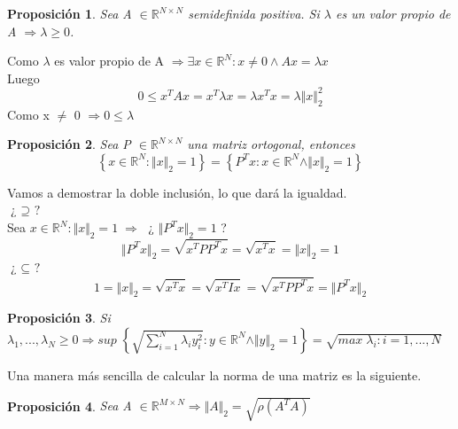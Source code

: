 \documentclass[10pt, a4paper]{article}
\makeatletter
\renewenvironment{proof}[1][\proofname] {\par\pushQED{\qed}\normalfont\topsep6\p@\@plus6\p@\relax\trivlist\item[\hskip\labelsep\itshape\sffamily#1\@addpunct{.}]\ignorespaces}{\popQED\endtrivlist\@endpefalse}
\theoremstyle{theorem-style}
\newtheorem{nprop}{Proposición}[section]
\theoremstyle{definition-style}
\theoremstyle{remark-style}
\theoremstyle{example-style}
\theoremstyle{definition-style}
\theoremstyle{remark-style}
\makeatother
\begin{document}
\begin{nprop}
Sea A $\in \mathbb{R}^{N \times N}$ semidefinida positiva. Si $\lambda$ es un valor propio de A $\Rightarrow \lambda \geq 0$.
\end{nprop}

\begin{proof}
Como $\lambda$ es valor propio de A $\Rightarrow \exists x \in \mathbb{R}^N : x \neq 0 \wedge Ax = \lambda x$\\
Luego\\
\[ 0 \leq x^TAx = x^T \lambda x = \lambda x^Tx = \lambda \Vert x \Vert _2^2 \]
Como x $\neq$ 0 $\Rightarrow 0 \leq \lambda$
\end{proof}

\begin{nprop}
Sea P $\in \mathbb{R}^{N \times N}$ una matriz ortogonal, entonces
\[ \left\lbrace x \in \mathbb{R}^N : \Vert x \Vert _2 = 1 \right\rbrace = \left\lbrace P^Tx : x \in \mathbb{R}^N \wedge \Vert x \Vert _2 = 1 \right\rbrace \]
\end{nprop}

\begin{proof}
Vamos a demostrar la doble inclusión, lo que dará la igualdad.\\
$\textbf{¿ $\supseteq$ ?}$\\
Sea $x \in \mathbb{R}^N : \Vert x \Vert _2 = 1 \; \Rightarrow \;$ ¿ $\Vert P^Tx \Vert _2 = 1 $ ?
\[ \Vert P^Tx \Vert _2 = \sqrt{x^TPP^Tx} = \sqrt{x^Tx} = \Vert x \Vert _2 = 1 \]
$\textbf{¿ $\subseteq$ ?}$\\
\[ 1 = \Vert x \Vert _2 = \sqrt{x^Tx} = \sqrt{x^TIx} = \sqrt{x^TPP^Tx} = \Vert P^Tx \Vert _2 \]
\end{proof}

\begin{nprop}
Si $\lambda _1,..., \lambda _N \geq 0 \Rightarrow sup \; \left\lbrace \sqrt{\sum_{i=1}^N \lambda _iy_i^2} : y \in \mathbb{R}^N \wedge \Vert y \Vert _2 = 1 \right\rbrace = \sqrt{max \; \lambda _i : i = 1,...,N} $
\end{nprop}

\begin{proof}
\end{proof}

Una manera más sencilla de calcular la norma de una matriz es la siguiente.

\begin{nprop}
Sea A $\in \mathbb{R}^{M \times N} \Rightarrow \Vert A \Vert _2 = \sqrt{\rho (A^TA)} $
\end{nprop}
\end{document}
